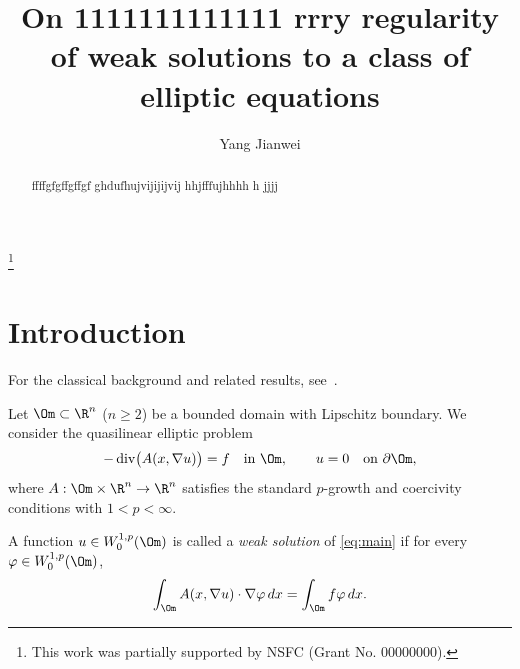






\hypersetup{colorlinks=true,linkcolor=blue,citecolor=blue}




















\title[Short title]{On 1111111111111 rrry regularity of weak solutions to a class of elliptic equations}
\author{Yang Jianwei} 


\thanks{This work was partially supported by NSFC (Grant No. 00000000).}



\begin{abstract}ffffgfgffgffgf ghdufhujvijijijvij hhjfffujhhhh h  jjjj
\end{abstract}

\maketitle

\section{Introduction}\label{sec:intro}
For the classical background and related results, see~\cite{GT,LU}.

Let $\Om\subset\R^n$ ($n\ge 2$) be a bounded domain with Lipschitz boundary.
We consider the quasilinear elliptic problem
\begin{equation}\label{eq:main}
  -\operatorname{div}\bigl(A(x,\nabla u)\bigr)=f \quad \text{in } \Om,
  \qquad u=0 \quad \text{on } \partial\Om ,
\end{equation}
where $A:\Om\times\R^n\to\R^n$ satisfies the standard $p$-growth and
coercivity conditions with $1<p<\infty$.

\begin{definition}\label{def:weak}
A function $u\in W^{1,p}_0(\Om)$ is called a \emph{weak solution} of
\eqref{eq:main} if for every $\varphi\in W^{1,p}_0(\Om)$,
\begin{equation}\label{eq:weak}
  \int_{\Om} A(x,\nabla u)\cdot\nabla\varphi\,dx
  = \int_{\Om} f\varphi\,dx .
\end{equation}
\end{definition}


